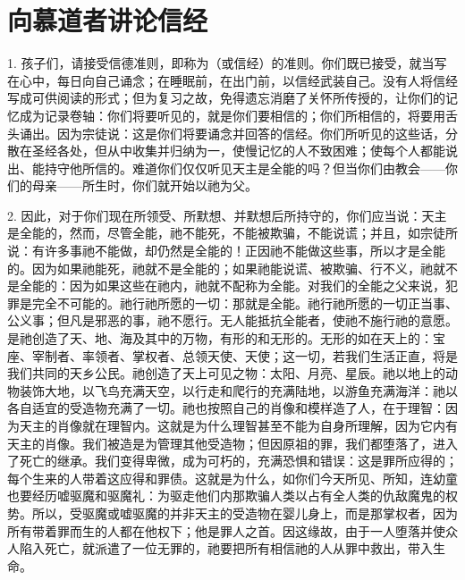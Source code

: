 
\chapter{向慕道者讲论信经}


1. 孩子们，请接受信德准则，即称为（或信经）的准则。你们既已接受，就当写在心中，每日向自己诵念；在睡眠前，在出门前，以信经武装自己。没有人将信经写成可供阅读的形式；但为复习之故，免得遗忘消磨了关怀所传授的，让你们的记忆成为记录卷轴：你们将要听见的，就是你们要相信的；你们所相信的，将要用舌头诵出。因为宗徒说：\newline{}这是你们将要诵念并回答的信经。你们所听见的这些话，分散在圣经各处，但从中收集并归纳为一，使慢记忆的人不致困难；使每个人都能说出、能持守他所信的。难道你们仅仅听见天主是全能的吗？但当你们由教会——你们的母亲——所生时，你们就开始以祂为父。\par

2. 因此，对于你们现在所领受、所默想、并默想后所持守的，你们应当说：天主是全能的，然而，尽管全能，祂不能死，不能被欺骗，不能说谎；并且，如宗徒所说：有许多事祂不能做，却仍然是全能的！正因祂不能做这些事，所以才是全能的。因为如果祂能死，祂就不是全能的；如果祂能说谎、被欺骗、行不义，祂就不是全能的：因为如果这些在祂内，祂就不配称为全能。对我们的全能之父来说，犯罪是完全不可能的。祂行祂所愿的一切：那就是全能。祂行祂所愿的一切正当事、公义事；但凡是邪恶的事，祂不愿行。无人能抵抗全能者，使祂不施行祂的意愿。是祂创造了天、地、海及其中的万物，有形的和无形的。无形的如在天上的：宝座、宰制者、率领者、掌权者、总领天使、天使；这一切，若我们生活正直，将是我们共同的天乡公民。祂创造了天上可见之物：太阳、月亮、星辰。祂以地上的动物装饰大地，以飞鸟充满天空，以行走和爬行的充满陆地，以游鱼充满海洋：祂以各自适宜的受造物充满了一切。祂也按照自己的肖像和模样造了人，在于理智：因为天主的肖像就在理智内。这就是为什么理智甚至不能为自身所理解，因为它内有天主的肖像。我们被造是为管理其他受造物；但因原祖的罪，我们都堕落了，进入了死亡的继承。我们变得卑微，成为可朽的，充满恐惧和错误：这是罪所应得的；每个生来的人带着这应得和罪债。这就是为什么，如你们今天所见、所知，连幼童也要经历嘘驱魔和驱魔礼：为驱走他们内那欺骗人类以占有全人类的仇敌魔鬼的权势。所以，受驱魔或嘘驱魔的并非天主的受造物在婴儿身上，而是那掌权者，因为所有带着罪而生的人都在他权下；他是罪人之首。因这缘故，由于一人堕落并使众人陷入死亡，就派遣了一位无罪的，祂要把所有相信祂的人从罪中救出，带入生命。\par


